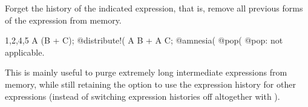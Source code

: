 
Forget the history of the indicated expression, that is, remove all
previous forms of the expression from memory. 
\begin{screen}{1,2,4,5}
A (B + C);
@distribute!(%
A B + A C;
@amnesia(%
@pop(%
@pop: not applicable.
\end{screen}
This is mainly useful to purge extremely long intermediate expressions
from memory, while still retaining the option to use the expression
history for other expressions (instead of switching expression
histories off altogether with ).

